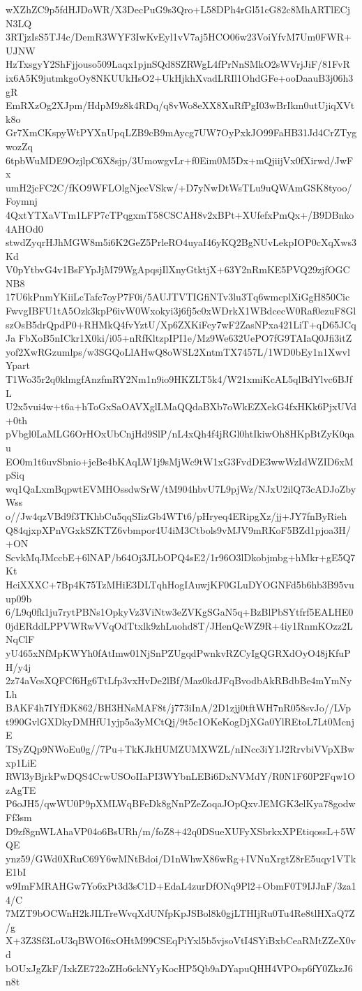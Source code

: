 wXZhZC9p5fdHJDoWR/X3DecPuG9s3Qro+L58DPh4rGl51cG82c8MhARTlECjN3LQ
3RTjzIsS5TJ4c/DemR3WYF3IwKvEyl1vV7aj5HCO06w23VoiYfvM7Um0FWR+UJNW
HzTxsgyY2ShFjjouso509Laqx1pjnSQd8SZRWgL4fPrNnSMkO2sWVrjJiF/81FvR
ix6A5K9jutmkgoOy8NKUUkHsO2+UkHjkhXvadLRIl1OhdGFe+ooDaauB3j06h3gR
EmRXzOg2XJpm/HdpM9z8k4RDq/q8vWo8eXX8XuRfPgI03wBrIkm0utUjiqXVtk8o
Gr7XmCKspyWtPYXnUpqLZB9cB9mAycg7UW7OyPxkJO99FaHB31Jd4CrZTygwozZq
6tpbWuMDE9OzjlpC6X8sjp/3UmowgvLr+f0Eim0M5Dx+mQjiijVx0fXirwd/JwFx
umH2jcFC2C/fKO9WFLOlgNjecVSkw/+D7yNwDtWsTLu9uQWAmGSK8tyoo/Foymnj
4QxtYTXaVTm1LFP7cTPqgxmT58CSCAH8v2xBPt+XUfefxPmQx+/B9DBnko4AHOd0
stwdZyqrHJhMGW8m5i6K2GeZ5PrleRO4uyaI46yKQ2BgNUvLekpIOP0cXqXws3Kd
V0pYtbvG4v1BsFYpJjM79WgApqsjIlXnyGtktjX+63Y2nRmKE5PVQ29zjfOGCNB8
17U6kPnmYKiiLcTafc7oyP7F0i/5AUJTVTIGfiNTv3lu3Tq6wmcplXiGgH850Cic
FwvgIBFU1tA5Ozk3kpP6ivW0Wxokyi3j6fj5c0xWDrkX1WBdcecW0Raf0ezuF8Gl
szOsB5drQpdP0+RHMkQ4fvYztU/Xp6ZXKiFcy7wF2ZasNPxa421LiT+qD65JCqJa
FbXoB5nICkr1X0ki/i05+nRfKltzpIPI1e/Mz9We632UePO7fG9TAIaQ0Jfi3itZ
yof2XwRGzumlps/w3SGQoLlAHwQ8oWSL2XntmTX7457L/1WD0bEy1n1XwvlYpart
T1Wo35r2q0klmgfAnzfmRY2Nm1n9io9HKZLT5k4/W21xmiKcAL5qlBdYlvc6BJfL
U2x5vui4w+t6a+hToGxSaOAVXglLMaQQdaBXb7oWkEZXekG4fxHKk6PjxUVd+0th
pVbgl0LaMLG6OrHOxUbCnjHd9SlP/nL4xQh4f4jRGl0htIkiwOh8HKpBtZyK0qau
EO0m1t6uvSbnio+jeBe4bKAqLW1j9sMjWc9tW1xG3FvdDE3wwWzIdWZID6xMpSiq
wq1QaLxmBqpwtEVMHOssdwSrW/tM904hbvU7L9pjWz/NJxU2ilQ73cADJoZbyWss
o//Jw4qzVBd9f3TKhbCu5qqSIizGb4WTt6/pHryeq4ERipgXz/jj+JY7fnByRieh
Q84qjxpXPnVGxkSZKTZ6vbmpor4U4iM3Ctbols9vMJV9mRKoF5BZd1pjoa3H/+ON
ScvkMqJMccbE+6lNAP/b64Oj3JLbOPQ4sE2/1r96O3lDkobjmbg+hMkr+gE5Q7Kt
HciXXXC+7Bp4K75TzMHiE3DLTqhHogIAuwjKF0GLuDYOGNFd5b6hb3B95vuup09b
6/L9q0fk1ju7rytPBNs1OpkyVz3ViNtw3eZVKgSGaN5q+BzBlPbSYtfrf5EALHE0
0jdERddLPPVWRwVVqOdTtxlk9zhLuohd8T/JHenQcWZ9R+4iy1RnmKOzz2LNqClF
yU465xNfMpKWYh0fAtImw01NjSnPZUgqdPwnkvRZCyIgQGRXdOyO48jKfuPH/y4j
2z74aVcsXQFCf6Hg6TtLfp3vxHvDe2lBf/Maz0kdJFqBvodbAkRBdbBe4mYmNyLh
BAKF4h7IYfDK862/BH3HNsMAF8t/j773iInA/2D1zjj0tftWH7nR058svJo//LVp
t990GvlGXDkyDMHfU1yjp5a3yMCtQj/9t5c1OKeKogDjXGa0YlREtoL7Lt0McnjE
TSyZQp9NWoEu0g//7Pu+TkKJkHUMZUMXWZL/nINcc3iY1J2RrvbiVVpXBwxp1LiE
RWl3yBjrkPwDQS4CrwUSOoIIaPI3WYbnLEBi6DxNVMdY/R0N1F60P2Fqw1OzAgTE
P6oJH5/qwWU0P9pXMLWqBFeDk8gNnPZeZoqaJOpQxvJEMGK3elKya78godwFf3sm
D9zf8gnWLAhaVP04o6BsURh/m/foZ8+42q0DSueXUFyXSbrkxXPEtiqossL+5WQE
ynz59/GWd0XRuC69Y6wMNtBdoi/D1nWhwX86wRg+IVNuXrgtZ8rE5uqy1VTkE1bI
w9ImFMRAHGw7Yo6xPt3d3sC1D+EdaL4zurDfONq9Pl2+ObmF0T9IJJnF/3za14/C
7MZT9bOCWnH2kJILTreWvqXdUNfpKpJSBol8k0gjLTHIjRu0Tu4Re8tlHXaQ7Z/g
X+3Z3Sf3LoU3qBWOI6xOHtM99CSEqPiYxl5b5vjsoVtI4SYiBxbCeaRMtZZeX0vd
bOUxJgZkF/IxkZE722oZHo6ckNYyKocHP5Qb9aDYapuQHH4VPOsp6fY0ZkzJ6n8t
